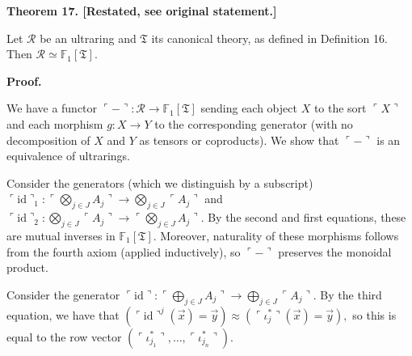 \documentclass[10pt,a4paper]{amsart}
\begin{document}
 
\par\medskip\noindent\textbf{Theorem 17. [Restated, see original statement.]}\par
 
 
Let $\mathcal{R}$ be an ultraring and $\mathfrak{T}$ its canonical theory, as defined in Definition 16. Then $\mathcal{R}\simeq\mathbb{F}_{1}[\mathfrak{T}]$.\par
 
 
 
 
 
 
\par\medskip\noindent\textbf{Proof.}\par
 
 
We have a functor $\ulcorner-\urcorner:\mathcal{R}\to\mathbb{F}_{1}[\mathfrak{T}]$ sending each object $X$ to the sort $\ulcorner X\urcorner$ and each morphism $g:X\to Y$ to the corresponding generator (with no decomposition of $X$ and $Y$ as tensors or coproducts). We show that $\ulcorner-\urcorner$ is an equivalence of ultrarings.\par
 
 
 
Consider the generators (which we distinguish by a subscript) $\ulcorner\mathrm{id}\urcorner_{1}:\ulcorner\bigotimes_{j\in J}A_{j}\urcorner%
\to\bigotimes_{j\in J}\ulcorner A_{j}\urcorner$ and $\ulcorner\mathrm{id}\urcorner_{2}:\bigotimes_{j\in J}\ulcorner A_{j}\urcorner%
\to\ulcorner\bigotimes_{j\in J}A_{j}\urcorner$. By the second and first equations, these are mutual inverses in $\mathbb{F}_{1}[\mathfrak{T}]$. Moreover, naturality of these morphisms follows from the fourth axiom (applied inductively), so $\ulcorner-\urcorner$ preserves the monoidal product.\par
 
 
 
Consider the generator $\ulcorner\mathrm{id}\urcorner:\ulcorner\bigoplus_{j\in J}A_{j}\urcorner\to%
\bigoplus_{j\in J}\ulcorner A_{j}\urcorner$. By the third equation, we have that $\left(\ulcorner\mathrm{id}\urcorner^{j}(\vec{x})=\vec{y}\right)\approx(%
\ulcorner\iota^{*}_{j}\urcorner(\vec{x})=\vec{y}),$ so this is equal to the row vector $(\ulcorner\iota^{*}_{j_{1}}\urcorner,\dotsc,\ulcorner\iota^{*}_{j_{n}}\urcorner)$.\par
 
\end{document}

